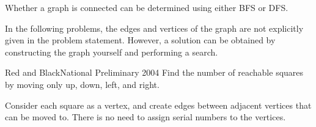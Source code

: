Whether a graph is connected can be determined using either BFS or DFS.

In the following problems, the edges and vertices of the graph are not explicitly given in the problem statement. However, a solution can be obtained by constructing the graph yourself and performing a search.

\begin{pbox}{Red and Black}{National Preliminary 2004}
Find the number of reachable squares by moving only up, down, left, and right.

\end{pbox}

Consider each square as a vertex, and create edges between adjacent vertices that can be moved to. There is no need to assign serial numbers to the vertices.

